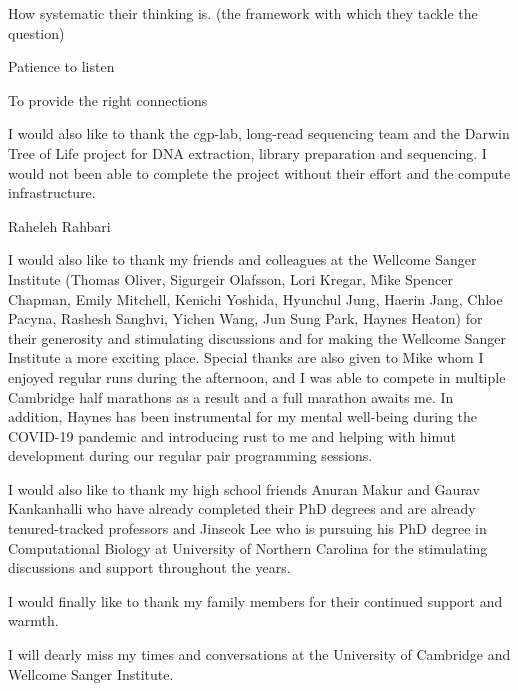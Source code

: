 \begin{acknowledgements}
How systematic their thinking is. (the framework with which they tackle the question)

Patience to listen 

To provide the right connections

I would also like to thank the cgp-lab, long-read sequencing team and the Darwin Tree of Life project for DNA extraction, library preparation and sequencing. I would not been able to complete the project without their effort and the compute infrastructure. 


Raheleh Rahbari 

I would also like to thank my friends and colleagues at the Wellcome Sanger Institute (Thomas Oliver, Sigurgeir Olafsson, Lori Kregar, Mike Spencer Chapman, Emily Mitchell, Kenichi Yoshida, Hyunchul Jung, Haerin Jang, Chloe Pacyna, Rashesh Sanghvi, Yichen Wang, Jun Sung Park, Haynes Heaton) for their generosity and stimulating discussions and for making the Wellcome Sanger Institute a more exciting place. Special thanks are also given to Mike whom I enjoyed regular runs during the afternoon, and I was able to compete in multiple Cambridge half marathons as a result and a full marathon awaits me. In addition, Haynes has been instrumental for my mental well-being during the COVID-19 pandemic and introducing rust to me and helping with himut development during our regular pair programming sessions. 

I would also like to thank my high school friends Anuran Makur and Gaurav Kankanhalli who have already completed their PhD degrees and are already tenured-tracked professors and Jinseok Lee who is pursuing his PhD degree in Computational Biology at University of Northern Carolina for the stimulating discussions and support throughout the years. 

I would finally like to thank my family members for their continued support and warmth. 

I will dearly miss my times and conversations at the University of Cambridge and Wellcome Sanger Institute.



\end{acknowledgements}
